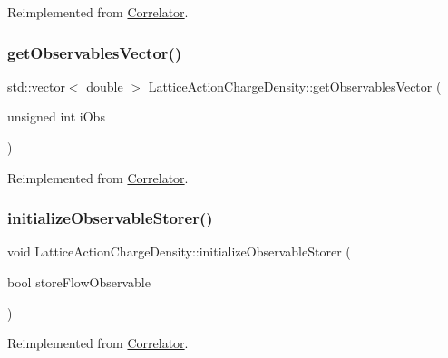 Reimplemented from \mbox{\hyperlink{class_correlator_ac780d8b180294ee4801ede6e6a13f7f4}{Correlator}}.

\mbox{\label{class_lattice_action_charge_density_a72952fbe5ade96d53196d6c2c93896e5}} 
\subsubsection{\texorpdfstring{getObservablesVector()}{getObservablesVector()}}
{\footnotesize\ttfamily std\+::vector$<$ double $>$ Lattice\+Action\+Charge\+Density\+::get\+Observables\+Vector (\begin{DoxyParamCaption}\item[{unsigned int}]{i\+Obs }\end{DoxyParamCaption})\hspace{0.3cm}{\ttfamily [virtual]}}



Reimplemented from \mbox{\hyperlink{class_correlator_a7fb062b098beb078f3e546f4717b4941}{Correlator}}.

\mbox{\label{class_lattice_action_charge_density_aba3131bbe5bd930adccc2852b4d44bb9}} 
\subsubsection{\texorpdfstring{initializeObservableStorer()}{initializeObservableStorer()}}
{\footnotesize\ttfamily void Lattice\+Action\+Charge\+Density\+::initialize\+Observable\+Storer (\begin{DoxyParamCaption}\item[{bool}]{store\+Flow\+Observable }\end{DoxyParamCaption})\hspace{0.3cm}{\ttfamily [virtual]}}



Reimplemented from \mbox{\hyperlink{class_correlator_ab99886c09dd27dfc8676d0032cecf9bc}{Correlator}}.

